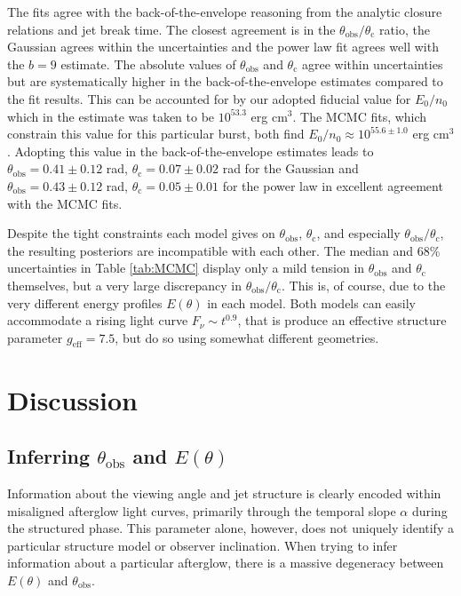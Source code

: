 \documentclass[twocolumn]{aastex62}
\newcommand{\thobs}{\ensuremath{\theta_{\mathrm{obs}}}}
\newcommand{\thC}{\ensuremath{\theta_{\mathrm{c}}}}
\newcommand{\geff}{\ensuremath{g_{\mathrm{eff}}}}
\begin{document}
The fits agree with the back-of-the-envelope reasoning from the analytic closure relations and jet break time.  The closest agreement is in the $\thobs/\thC$ ratio, the Gaussian agrees within the uncertainties and the power law fit agrees well with the $b=9$ estimate. The absolute values of $\thobs$ and $\thC$ agree within uncertainties but are systematically higher in the back-of-the-envelope estimates compared to the fit results.  This can be accounted for by our adopted fiducial value for $E_0/n_0$ which in the estimate was taken to be $10^{53.3}$ erg cm$^3$.  The MCMC fits, which constrain this value for this particular burst, both find $E_0/n_0 \approx 10^{55.6 \pm 1.0}$ erg cm$^{3}$.  Adopting this value in the back-of-the-envelope estimates leads to $\thobs = 0.41\pm0.12$ rad, $\thC = 0.07 \pm 0.02$ rad for the Gaussian and $\thobs = 0.43\pm0.12$ rad, $\thC = 0.05 \pm 0.01$ for the power law in excellent agreement with the MCMC fits. 

Despite the tight constraints each model gives on $\thobs$, $\thC$, and especially $\thobs/\thC$, the resulting posteriors are incompatible with each other.  The median and 68\% uncertainties in Table \ref{tab:MCMC} display only a mild tension in $\thobs$  and $\thC$ themselves, but a very large discrepancy in $\thobs/\thC$.  This is, of course, due to the very different energy profiles $E(\theta)$ in each model.  Both models can easily accommodate a rising light curve $F_\nu \sim t^{0.9}$, that is produce an effective structure parameter $\geff = 7.5$, but do so using somewhat different geometries.  


%
%

\section{Discussion}\label{sec:discussion}

\subsection{Inferring $\thobs$ and $E(\theta)$}

Information about the viewing angle and jet structure is clearly encoded within misaligned afterglow light curves, primarily through the temporal slope $\alpha$ during the structured phase.   This parameter alone, however, does not uniquely identify a particular structure model or observer inclination.  When trying to infer information about a particular afterglow, there is a massive degeneracy between $E(\theta)$ and $\thobs$.  
\end{document}
